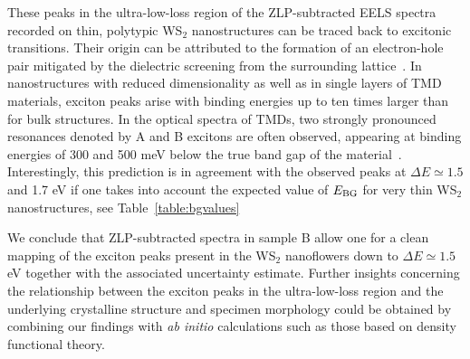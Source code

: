 These peaks in the ultra-low-loss region of the ZLP-subtracted EELS spectra recorded on thin, polytypic
WS$_2$ nanostructures can be traced back to excitonic transitions.
%
Their origin can be attributed to the formation of an electron-hole pair mitigated
by the dielectric screening from the surrounding lattice~\cite{Hanbicki:2016}.
%
In nanostructures with reduced dimensionality as well as in single layers of TMD materials,
exciton peaks arise with binding energies up to ten times larger than for bulk structures.
%
In the optical spectra of TMDs, two strongly pronounced resonances denoted by A and B
excitons are often observed, appearing at binding energies of 300 and
500 meV below the true band gap of the material~\cite{Karivaj:2019}.
%
Interestingly, this prediction is in agreement with the observed peaks at
$\Delta E\simeq 1.5$ and 1.7 eV if one takes into account the expected
value of $E_{\rm BG}$ for very thin  WS$_2$ nanostructures, see Table~\ref{table:bgvalues}

We  conclude that ZLP-subtracted spectra in sample B allow one for
a clean mapping of the exciton peaks present in the WS$_2$ nanoflowers
down to $\Delta E\simeq 1.5$ eV together with
the associated uncertainty estimate.
%
Further insights concerning the relationship between the exciton peaks in the ultra-low-loss region
and the underlying crystalline structure and specimen morphology could be obtained
by combining our findings with {\it ab initio} calculations such as those based on
density functional theory.
